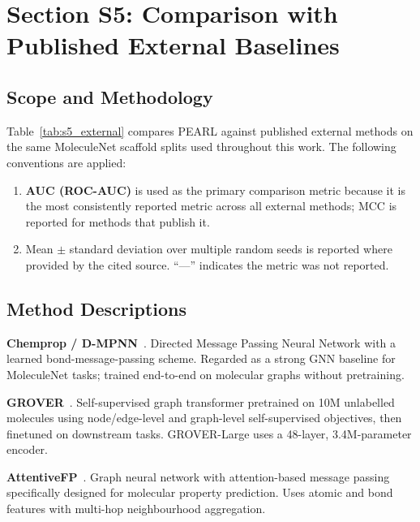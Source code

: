 \documentclass[9pt,a4paper]{article}
\begin{document}
\section*{Section S5: Comparison with Published External Baselines}

\subsection*{Scope and Methodology}

Table~\ref{tab:s5_external} compares PEARL against published external methods on
the same MoleculeNet scaffold splits used throughout this work.
The following conventions are applied:
\begin{enumerate}
  \item \textbf{AUC (ROC-AUC)} is used as the primary comparison metric because it
    is the most consistently reported metric across all external methods; MCC is
    reported for methods that publish it.
  \item Mean $\pm$ standard deviation over multiple random seeds is reported where
    provided by the cited source. ``---'' indicates the metric was not reported.
\end{enumerate}

\subsection*{Method Descriptions}

\noindent\textbf{Chemprop / D-MPNN}~\cite{yang2019chemprop}.
Directed Message Passing Neural Network with a learned bond-message-passing scheme.
Regarded as a strong GNN baseline for MoleculeNet tasks; trained end-to-end on
molecular graphs without pretraining.

\noindent\textbf{GROVER}~\cite{rong2020grover}.
Self-supervised graph transformer pretrained on 10M unlabelled molecules using
node/edge-level and graph-level self-supervised objectives, then finetuned on
downstream tasks. GROVER-Large uses a 48-layer, 3.4M-parameter encoder.

\noindent\textbf{AttentiveFP}~\cite{xiong2020attentivefp}.
Graph neural network with attention-based message passing specifically designed
for molecular property prediction. Uses atomic and bond features with multi-hop
neighbourhood aggregation.
\end{document}
